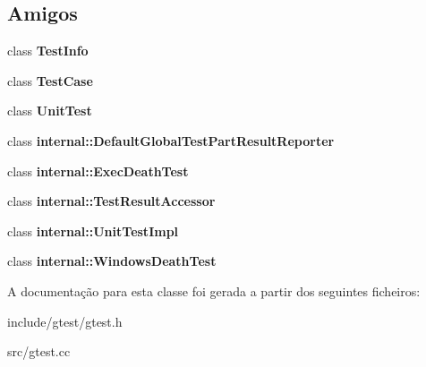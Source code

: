 \subsection*{Amigos}
\begin{DoxyCompactItemize}
\item 
\hypertarget{classtesting_1_1TestResult_a4c49c2cdb6c328e6b709b4542f23de3c}{class {\bfseries Test\-Info}}\label{classtesting_1_1TestResult_a4c49c2cdb6c328e6b709b4542f23de3c}

\item 
\hypertarget{classtesting_1_1TestResult_aff779e55b06adfa7c0088bd10253f0f0}{class {\bfseries Test\-Case}}\label{classtesting_1_1TestResult_aff779e55b06adfa7c0088bd10253f0f0}

\item 
\hypertarget{classtesting_1_1TestResult_a832b4d233efee1a32feb0f4190b30d39}{class {\bfseries Unit\-Test}}\label{classtesting_1_1TestResult_a832b4d233efee1a32feb0f4190b30d39}

\item 
\hypertarget{classtesting_1_1TestResult_abae39633da9932847b41cb80efd62115}{class {\bfseries internal\-::\-Default\-Global\-Test\-Part\-Result\-Reporter}}\label{classtesting_1_1TestResult_abae39633da9932847b41cb80efd62115}

\item 
\hypertarget{classtesting_1_1TestResult_adf5553cae6aea6f8648d47e299237e34}{class {\bfseries internal\-::\-Exec\-Death\-Test}}\label{classtesting_1_1TestResult_adf5553cae6aea6f8648d47e299237e34}

\item 
\hypertarget{classtesting_1_1TestResult_ae762da04e74a0d3b0daded3c5bd4a8e8}{class {\bfseries internal\-::\-Test\-Result\-Accessor}}\label{classtesting_1_1TestResult_ae762da04e74a0d3b0daded3c5bd4a8e8}

\item 
\hypertarget{classtesting_1_1TestResult_acc0a5e7573fd6ae7ad1878613bb86853}{class {\bfseries internal\-::\-Unit\-Test\-Impl}}\label{classtesting_1_1TestResult_acc0a5e7573fd6ae7ad1878613bb86853}

\item 
\hypertarget{classtesting_1_1TestResult_a6aeedc04a0590fcc1b3c5f687dbb0f9f}{class {\bfseries internal\-::\-Windows\-Death\-Test}}\label{classtesting_1_1TestResult_a6aeedc04a0590fcc1b3c5f687dbb0f9f}

\end{DoxyCompactItemize}


A documentação para esta classe foi gerada a partir dos seguintes ficheiros\-:\begin{DoxyCompactItemize}
\item 
include/gtest/gtest.\-h\item 
src/gtest.\-cc\end{DoxyCompactItemize}
